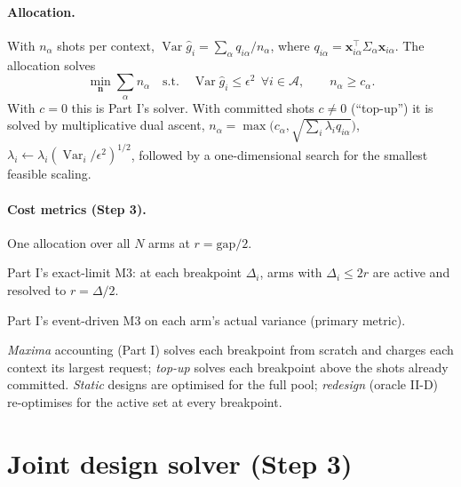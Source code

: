 \documentclass[10.5pt]{article}
\newcommand{\Var}{\operatorname{Var}}
\begin{document}
\paragraph{Allocation.}
With $n_\alpha$ shots per context, $\Var\hat g_i=\sum_\alpha q_{i\alpha}/n_\alpha$, where $q_{i\alpha}=\bm x_{i\alpha}^{\!\top}\Sigma_\alpha\bm x_{i\alpha}$. The allocation solves
\begin{equation}
  \min_{\bm n}\sum_\alpha n_\alpha\quad\text{s.t.}\quad\Var\hat g_i\le\epsilon^2\ \ \forall i\in\mathcal A,\qquad n_\alpha\ge c_\alpha .
  \label{eq:alloc}
\end{equation}
With $c=0$ this is Part I's solver. With committed shots $c\neq0$ (``top-up'') it is solved by multiplicative dual ascent, $n_\alpha=\max\!\big(c_\alpha,\sqrt{\sum_i\lambda_iq_{i\alpha}}\big)$, $\lambda_i\leftarrow\lambda_i(\Var_i/\epsilon^2)^{1/2}$, followed by a one-dimensional search for the smallest feasible scaling.

\paragraph{Cost metrics (Step 3).}
\begin{description}[leftmargin=5.8em,labelwidth=5.4em]
  \item[M1] One allocation over all $N$ arms at $r=\mathrm{gap}/2$.
  \item[M3 bound] Part I's exact-limit M3: at each breakpoint $\Delta_i$, arms with $\Delta_i\le2r$ are active and resolved to $r=\Delta/2$.
  \item[M3 actual] Part I's event-driven M3 on each arm's actual variance (primary metric).
\end{description}
\emph{Maxima} accounting (Part I) solves each breakpoint from scratch and charges each context its largest request; \emph{top-up} solves each breakpoint above the shots already committed. \emph{Static} designs are optimised for the full pool; \emph{redesign} (oracle II-D) re-optimises for the active set at every breakpoint.

\section{Joint design solver (Step 3)}
\label{sec:solver}
\end{document}
